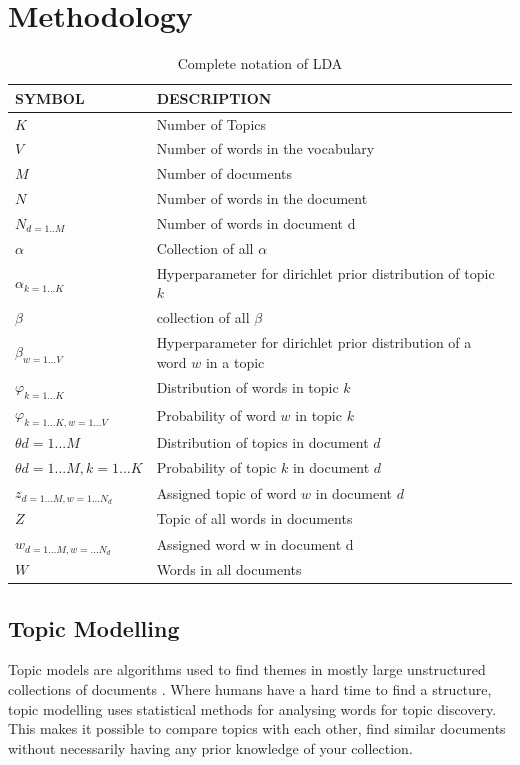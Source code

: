 \chapter{Methodology}  \label{ch:methodology}

\begin{table}[h]
\centering
 \begin{tabular}{l l} 
 \hline
 SYMBOL & DESCRIPTION \\ 
 \hline
 $K$ & Number of Topics \\  
 $V$ & Number of words in the vocabulary \\
 $M$ & Number of documents \\
 $N$ & Number of words in the document \\
 $N_{d=1..M}$ & Number of words in document d\\
 $\alpha$ & Collection of all $\alpha$ \\
 $\alpha_{k=1...K}$ & Hyperparameter for dirichlet prior distribution of topic $k$ \\
 $\beta$ & collection of all $\beta$ \\
 $\beta_{w=1...V}$ & Hyperparameter for dirichlet prior distribution of a word $w$ in a topic \\
 $\varphi_{k=1...K}$ & Distribution of words in topic $k$ \\
 $\varphi_{k=1...K, w=1...V}$ & Probability of  word $w$ in topic $k$  \\
 $\theta{d=1...M}$ & Distribution of topics in document $d$  \\
 $\theta{d=1...M, k=1...K}$ & Probability of  topic $k$ in document $d$ \\
 $z_{d=1...M, w=1...N_d}$ & Assigned topic of word $w$ in document $d$\\
 $Z$ & Topic of all words in documents \\
 $w_{d=1...M, w=...N_d}$ & Assigned word w in document d \\ 
 $W$ & Words in all documents \\ 

 

 
 \hline
 \end{tabular}
\caption{Complete notation of LDA}
\label{tab:table1}
\end{table}

\section{Topic Modelling}
Topic models are algorithms used to find themes in mostly large unstructured collections of documents \cite{Blei2010ProbabilisticModels}. Where humans have a hard time to find a structure, topic modelling uses statistical methods for analysing words for topic discovery. This makes it possible to compare topics with each other, find similar documents without necessarily having any prior knowledge of your collection. 


